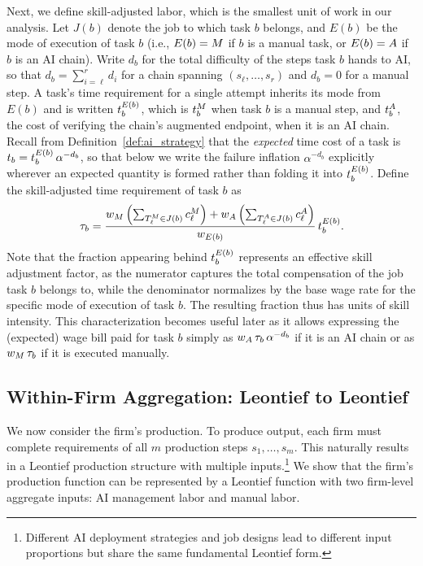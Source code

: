 Next, we define skill-adjusted labor, which is the smallest unit of work in our analysis.
Let $J(b)$ denote the job to which task $b$ belongs, and $E(b)$ be the mode of execution of task $b$ (i.e., $E(b) = M$ if $b$ is a manual task, or $E(b) = A$ if $b$ is an AI chain).
Write $d_b$ for the total difficulty of the steps task $b$ hands to AI, so that $d_b = \sum_{i=\ell}^{r} d_i$ for a chain spanning $(s_\ell, \dotsc, s_r)$ and $d_b = 0$ for a manual step.
A task's time requirement for a single attempt inherits its mode from $E(b)$ and is written $t^{E(b)}_{b}$, which is $t^{M}_{b}$ when task $b$ is a manual step, and $t^{A}_{b}$, the cost of verifying the chain's augmented endpoint, when it is an AI chain.
Recall from Definition~\ref{def:ai_strategy} that the \emph{expected} time cost of a task is $t_{b} = t^{E(b)}_{b}\,\alpha^{-d_b}$, so that below we write the failure inflation $\alpha^{-d_b}$ explicitly wherever an expected quantity is formed rather than folding it into $t^{E(b)}_{b}$.
Define the skill-adjusted time requirement of task $b$ as
\[
\tau_b = \frac{w_{M} \left(\sum_{T_{\ell}^{M} \in J(b)} c^{M}_{\ell}\right) + w_{A} \left(\sum_{T_{\ell}^{A} \in J(b)} c^{A}_{\ell}\right)}{w_{E(b)}} \, t^{E(b)}_{b}.
\]
Note that the fraction appearing behind $t^{E(b)}_{b}$ represents an effective skill adjustment factor, as the numerator captures the total compensation of the job task $b$ belongs to, while the denominator normalizes by the base wage rate for the specific mode of execution of task $b$.
The resulting fraction thus has units of skill intensity.
This characterization becomes useful later as it allows expressing the (expected) wage bill paid for task $b$ simply as $w_{A}\,\tau_{b}\,\alpha^{-d_b}$ if it is an AI chain or as $w_{M}\,\tau_{b}$ if it is executed manually.


\subsection{Within-Firm Aggregation: Leontief to Leontief}
\label{sec:agg_within}

We now consider the firm's production.
To produce output, each firm must complete requirements of all \( m \) production steps \( s_1, \ldots, s_m \).
This naturally results in a Leontief production structure with multiple inputs.\footnote{
Different AI deployment strategies and job designs lead to different input proportions but share the same fundamental Leontief form.
}
We show that the firm's production function can be represented by a Leontief function with two firm-level aggregate inputs: AI management labor and manual labor.

